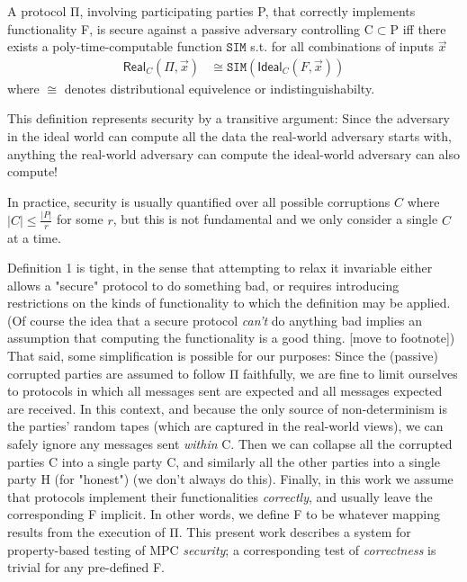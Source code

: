 \documentclass[conference]{IEEEtran}
\begin{document}
\begin{definition}
    A protocol Π,
    involving participating parties P,
    that correctly implements functionality F,
    is secure against a passive adversary controlling C$\subset$P iff
    there exists a poly-time-computable function $\mathtt{SIM}$ s.t.
    for all combinations of inputs $\vec{x}$
    $$\begin{aligned}
        \mathsf{Real}_C(Π, \vec{x}) &\cong \mathtt{SIM}(\mathsf{Ideal}_C(F,\vec{x}))
    \end{aligned}$$
    where $\cong$ denotes distributional equivelence or indistinguishabilty.
\end{definition}

This definition represents security by a transitive argument:
Since the adversary in the ideal world can compute all the data the real-world adversary starts with,
anything the real-world adversary can compute the ideal-world adversary can also compute!

In practice, security is usually quantified over all possible corruptions $C$
where $\lvert C \rvert \leq \frac{\lvert P \rvert}{r}$ for some $r$, but this is not fundamental and we only consider a single $C$ at a time.

Definition 1 is tight, in the sense that attempting to relax it invariable either
allows a "secure" protocol to do something bad, or requires introducing restrictions
on the kinds of functionality to which the definition may be applied.
(Of course the idea that a secure protocol \textit{can't} do anything bad implies an assumption that computing
the functionality is a good thing. [move to footnote])
That said, some simplification is possible for our purposes:
Since the (passive) corrupted parties are assumed to follow Π faithfully, we are fine to limit ourselves to
 protocols in which all messages sent are expected and all messages expected are received.
In this context, and because the only source of non-determinism is the parties' random tapes
(which are captured in the real-world views),
we can safely ignore any messages sent \textit{within} C.
Then we can collapse all the corrupted parties C into a single party C,
and similarly all the other parties into a single party H (for "honest")
(we don't always do this).
Finally, in this work we assume that protocols implement their functionalities \textit{correctly},
and usually leave the corresponding F implicit.
In other words, we define F to be whatever mapping results from the execution of Π.
This present work describes a system for property-based testing of MPC \textit{security};
a corresponding test of \textit{correctness} is trivial for any pre-defined F.
\end{document}
